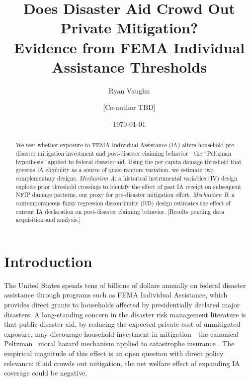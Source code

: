 \documentclass[12pt]{article}
\newcommand{\IA}{\textrm{IA}}
\newcommand{\RD}{\textrm{RD}}
\newcommand{\IV}{\textrm{IV}}
\begin{document}

\title{Does Disaster Aid Crowd Out Private Mitigation?\\
       Evidence from FEMA Individual Assistance Thresholds}
\author{Ryan Vaughn \and [Co-author TBD]}
\date{\today}
\maketitle

\begin{abstract}
We test whether exposure to FEMA Individual Assistance (\IA{}) alters household
pre-disaster mitigation investment and post-disaster claiming behavior—the
``Peltzman hypothesis'' applied to federal disaster aid.
Using the per-capita damage threshold that governs \IA{} eligibility as a
source of quasi-random variation, we estimate two complementary designs.
\emph{Mechanism A}: a historical instrumental variables (\IV{}) design exploits
prior threshold crossings to identify the effect of past \IA{} receipt on
subsequent NFIP damage patterns, our proxy for pre-disaster mitigation effort.
\emph{Mechanism B}: a contemporaneous fuzzy regression discontinuity (\RD{})
design estimates the effect of current \IA{} declaration on post-disaster
claiming behavior.
[Results pending data acquisition and analysis.]
\end{abstract}

\newpage
\tableofcontents
\newpage

\section{Introduction}
\label{sec:intro}

The United States spends tens of billions of dollars annually on federal
disaster assistance through programs such as FEMA Individual Assistance,
which provides direct grants to households affected by presidentially declared
major disasters.
A long-standing concern in the disaster risk management literature is that
public disaster aid, by reducing the expected private cost of unmitigated
exposure, may discourage household investment in mitigation—the canonical
Peltzman~\citeyearpar{peltzman1975} moral hazard mechanism applied to
catastrophe insurance \citep{kunreuther2004,browne2008}.
The empirical magnitude of this effect is an open question with direct policy
relevance: if aid crowds out mitigation, the net welfare effect of expanding
\IA{} coverage could be negative.
\end{document}
